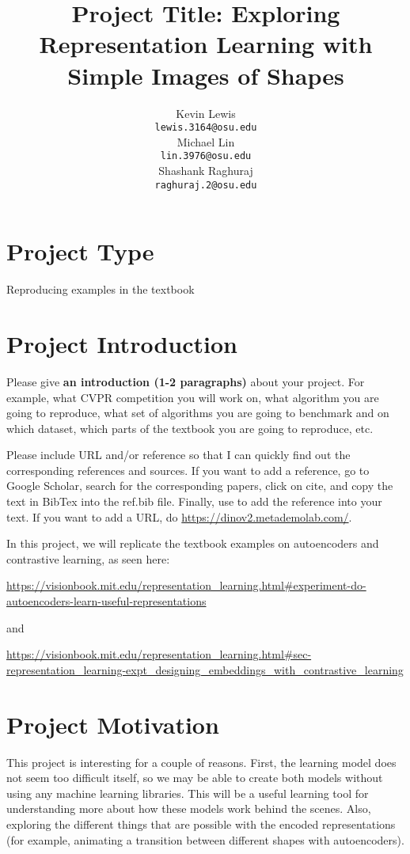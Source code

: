 \documentclass{article}
\title{Project Title: Exploring Representation Learning with Simple Images of Shapes}
\author{%
  Kevin Lewis\\
  \texttt{lewis.3164@osu.edu} \\
  \And
  Michael Lin\\
  \texttt{lin.3976@osu.edu} \\
    \And
  Shashank Raghuraj\\
  \texttt{raghuraj.2@osu.edu} \\
}
\begin{document}
\maketitle



\section{Project Type}
Reproducing examples in the textbook

\section{Project Introduction}
{\color{red}
Please give \textbf{an introduction (1-2 paragraphs)} about your project. For example, what CVPR competition you will work on, what algorithm you are going to reproduce, what set of algorithms you are going to benchmark and on which dataset, which parts of the textbook you are going to reproduce, etc. 


Please include URL and/or reference so that I can quickly find out the corresponding references and sources. If you want to add a reference, go to Google Scholar, search for the corresponding papers, click on cite, and copy the text in BibTex into the ref.bib file. Finally, use \cite{oquab2023dinov2} to add the reference into your text. 
If you want to add a URL, do \url{https://dinov2.metademolab.com/}.

} 

In this project, we will replicate the textbook examples on autoencoders and contrastive learning, as seen here: 

\url{https://visionbook.mit.edu/representation_learning.html#experiment-do-autoencoders-learn-useful-representations}

and 

\url{https://visionbook.mit.edu/representation_learning.html#sec-representation_learning-expt_designing_embeddings_with_contrastive_learning}


\section{Project Motivation}

This project is interesting for a couple of reasons. First, the learning model does not seem too difficult itself, so we may be able to create both models without using any machine learning libraries.  This will be a useful learning tool for understanding more about how these models work behind the scenes.  Also, exploring the different things that are possible with the encoded representations (for example, animating a transition between different shapes with autoencoders).
\end{document}
